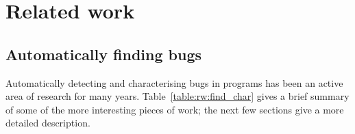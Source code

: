 \chapter{Related work}
\label{chapter:related_work}


\section{Automatically finding bugs}

Automatically detecting and characterising bugs in programs has been
an active area of research for many years.
Table~\ref{table:rw:find_char} gives a brief summary of some of the
more interesting pieces of work; the next few sections give a more
detailed description.

